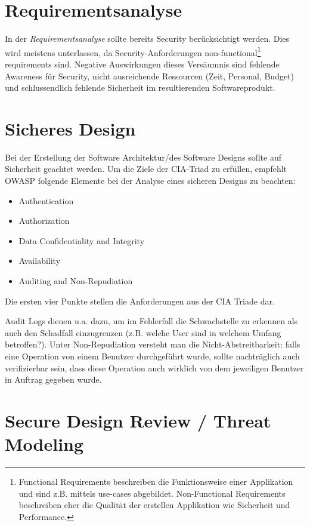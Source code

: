 \section{Requirementsanalyse}

In der \textit{Requirementsanalyse} sollte bereits Security berücksichtigt werden. Dies wird meistens unterlassen, da Security-Anforderungen non-functional\footnote{Functional Requirements beschreiben die Funktionsweise einer Applikation und sind z.B. mittels use-cases abgebildet. Non-Functional Requirements beschreiben eher die Qualität der erstellen Applikation wie Sicherheit und Performance.} requirements sind. Negative Auswirkungen dieses Versäumnis sind fehlende Awareness für Security, nicht ausreichende Ressourcen (Zeit, Personal, Budget) und schlussendlich fehlende Sicherheit im resultierenden Softwareprodukt.

\section{Sicheres Design}

Bei der Erstellung der Software Architektur/des Software Designs sollte auf Sicherheit geachtet werden. Um die Ziele der CIA-Triad zu erfüllen, empfehlt OWASP folgende Elemente bei der Analyse eines sicheren Designs zu beachten:

\begin{itemize}
	\item Authentication
	\item Authorization
	\item Data Confidentiality and Integrity
	\item Availability
	\item Auditing and Non-Repudiation
\end{itemize}

Die ersten vier Punkte stellen die Anforderungen aus der CIA Triade dar.

Audit Logs dienen u.a. dazu, um im Fehlerfall die Schwachstelle zu erkennen als auch den Schadfall einzugrenzen (z.B. welche User sind in welchem Umfang betroffen?). Unter Non-Repudiation versteht man die Nicht-Abstreitbarkeit: falls eine Operation von einem Benutzer durchgeführt wurde, sollte nachträglich auch verifizierbar sein, dass diese Operation auch wirklich von dem jeweiligen Benutzer in Auftrag gegeben wurde.

\section{Secure Design Review / Threat Modeling}
\label{threat_model}

